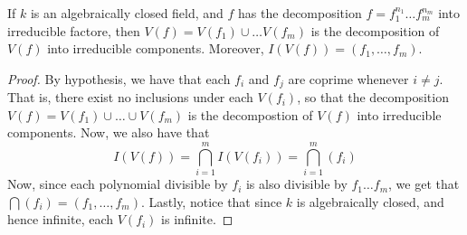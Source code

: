 \begin{corollary}
    If $k$ is an algebraically closed field, and $f$ has the decomposition
    $f=f_1^{n_1} \dots f_m^{n_m}$ into irreducible factore, then $V(f)=V(f_1)
    \cup \dots V(f_m)$ is the decomposition of $V(f)$ into irreducible
    components. Moreover, $I(V(f))=(f_1, \dots, f_m)$.
\end{corollary}
\begin{proof}
    By hypothesis, we have that each $f_i$ and $f_j$ are coprime whenever $i
    \neq j$. That is, there exist no inclusions under each $V(f_i)$, so that the
    decomposition $V(f)=V(f_1) \cup \dots \cup V(f_m)$ is the decompostion of
    $V(f)$ into irreducible components. Now, we also have that
    \begin{equation*}
        I(V(f))=\bigcap_{i=1}^m{I(V(f_i))}=\bigcap_{i=1}^m{(f_i)}
    \end{equation*}
    Now, since each polynomial divisible by $f_i$ is also divisible by $f_1
    \dots f_m$, we get that $\bigcap{(f_i)}=(f_1, \dots, f_m)$. Lastly, notice
    that since $k$ is algebraically closed, and hence infinite, each $V(f_i)$ is
    infinite.
\end{proof}
